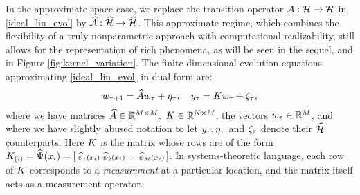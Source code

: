 In the approximate space case, we replace the transition operator $\mathcal{A}:\mathcal{H}\to\mathcal{H}$ in \eqref{ideal_lin_evol} by $\widehat{\mathcal{A}}:\widehat{\mathcal{H}}\to\widehat{\mathcal{H}}$.
This approximate regime, which combines the flexibility of a truly nonparametric approach with computational realizability, still allows for the representation of rich phenomena, as will be seen in the sequel, and in Figure \ref{fig:kernel_variation}. 
The finite-dimensional evolution equations approximating \eqref{ideal_lin_evol} in dual form are:
\vspace{-0.05in}
\begin{align} \eqlabel{k_measure}
 \weight_{\tindex+1} = \dualopApprox\weight_{\tindex} + \processnoise_{\tindex}, \quad 
 \meas_{\tindex} = \obsMat \weight_{\tindex} +\measnoise_{\tindex},
\end{align}
where we have matrices $\dualopApprox\in \R^{\ncent\times\ncent}, \ \obsMat\in \R^{\nsamp\times\ncent}$, the vectors $w_{\tau}\in\mathbb{R}^{M}$, and where we have slightly abused notation to let $y_{\tau}, \eta_{\tau}$ and $\zeta_{\tau}$ denote their $\widehat{\mathcal{H}}$ counterparts. Here $K$ is the matrix whose rows are of the form $K_{(i)} = \widehat{\Psi}(x_i) =
 \left[\begin{smallmatrix}
  \widehat{\psi}_1(x_i) & \widehat{\psi}_2(x_i) & \cdots & \widehat{\psi}_{M}(x_i)
 \end{smallmatrix}\right]$. In systems-theoretic language, each row of $K$ corresponds to a \emph{measurement} at a particular location, and the matrix itself acts as a measurement operator. 

